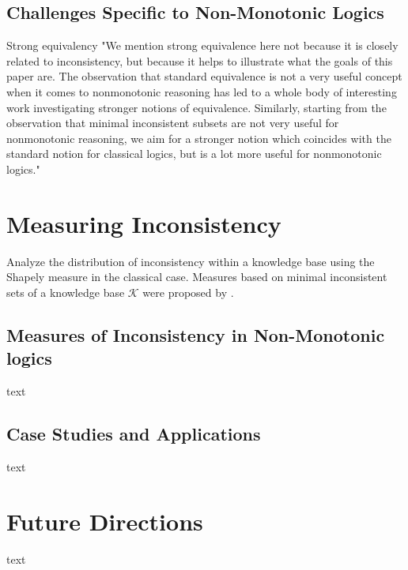 \subsection{Challenges Specific to Non-Monotonic Logics}
Strong equivalency \cite{lifschitz_strongly_2001}
"We mention strong equivalence here not because it is closely related to inconsistency, but because it helps to illustrate what the goals of this paper are. The observation that standard equivalence is not a very useful concept when it comes to nonmonotonic reasoning has led to a whole body of interesting work investigating stronger notions of equivalence. Similarly, starting from the observation that minimal inconsistent subsets are not very useful for nonmonotonic reasoning, we aim for a stronger notion which coincides with the standard notion for classical logics, but is a lot more useful for nonmonotonic logics." \cite{brewka_strong_2019}

\section{Measuring Inconsistency}
Analyze the distribution of inconsistency within a knowledge base using the Shapely measure \cite{hunter_measure_2010} in the classical case.
Measures based on minimal inconsistent sets of a knowledge base \(\mathcal{K}\) \cite{jabbour_mis_2016} were proposed by \cite{ulbricht_measuring_2018}.

\subsection{Measures of Inconsistency in Non-Monotonic logics}
text

\subsection{Case Studies and Applications}
text

\section{Future Directions}
text

